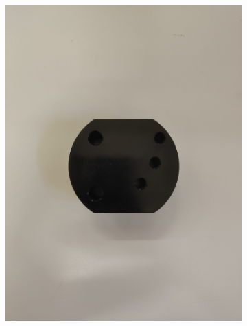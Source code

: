 \begin{figure}[H]
    \centering
    \begin{subfigure}[b]{0.4\textwidth}
        \includegraphics[width=\textwidth]{images/object.jpg}
        \label{fig:object}
    \end{subfigure}
    \qquad
    \begin{subfigure}[b]{0.4\textwidth}

\end{subfigure}
\end{figure}
